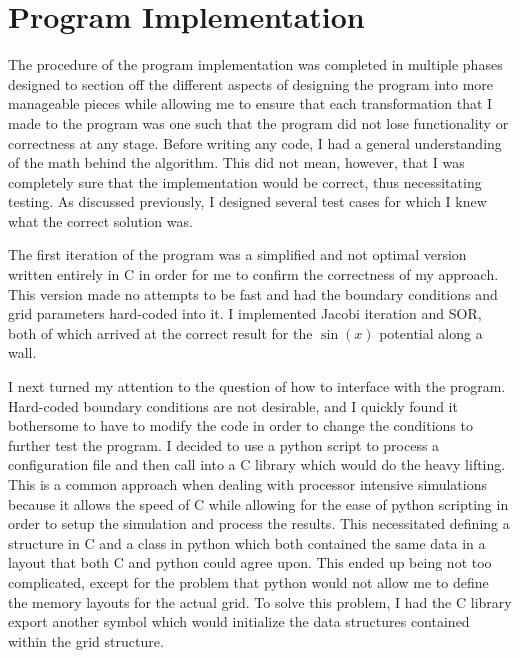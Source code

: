 \section{Program Implementation}
\label{app:des}
The procedure of the program implementation was completed in multiple phases designed to section off
the different aspects of designing the program into more manageable pieces while allowing me to ensure
that each transformation that I made to the program was one such that the program did not lose functionality
or correctness at any stage. Before writing any code, I had a general understanding of the math behind the
algorithm. This did not mean, however, that I was completely sure that the implementation would be correct,
thus necessitating testing. As discussed previously, I designed several test cases for which I knew what the
correct solution was.

The first iteration of the program was a simplified and not optimal version written entirely
in C in order for me to confirm the correctness of my approach. This version made no attempts to
be fast and had the boundary conditions and grid parameters hard-coded into it. I implemented
Jacobi iteration and SOR, both of which arrived at the correct result for the $\sin(x)$ potential
along a wall.

I next turned my attention to the question of how to interface with the program. Hard-coded boundary conditions
are not desirable, and I quickly found it bothersome to have to modify the code in order to change the conditions
to further test the program. I decided to use a python script to process a configuration file and then call into a
C library which would do the heavy lifting. This is a common approach when dealing with processor intensive simulations
because it allows the speed of C while allowing for the ease of python scripting in order to setup the simulation and
process the results. This necessitated defining a structure in C and a class in python which both contained the same
data in a layout that both C and python could agree upon. This ended up being not too complicated, except for the problem
that python would not allow me to define the memory layouts for the actual grid. To solve this problem, I had the C library
export another symbol which would initialize the data structures contained within the grid structure.

